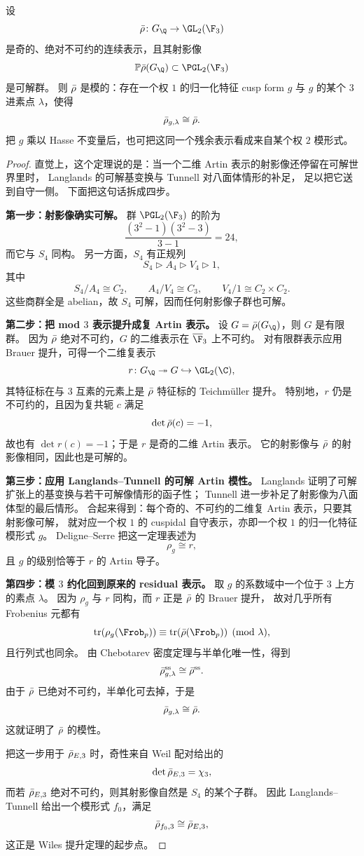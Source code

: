 \begin{lemma}
\label{lem:ch10-langlands-tunnell}
设
\[
  \rhobar\colon G_\Q\to \GL_2(\F_3)
\]
是奇的、绝对不可约的连续表示，且其射影像
\[
  \mathbb P\rhobar(G_\Q)\subset \PGL_2(\F_3)
\]
是可解群。
则 $\bar{\rho}$ 是模的：存在一个权 $1$ 的归一化特征 cusp form $g$ 与 $g$ 的某个 $3$ 进素点 $\lambda$，使得
\[
  \bar{\rho}_{g,\lambda}\cong \bar{\rho}.
\]
把 $g$ 乘以 Hasse 不变量后，也可把这同一个残余表示看成来自某个权 $2$ 模形式。
\end{lemma}

\begin{proof}
直觉上，这个定理说的是：当一个二维 Artin 表示的射影像还停留在可解世界里时，
Langlands 的可解基变换与 Tunnell 对八面体情形的补足，
足以把它送到自守一侧。
下面把这句话拆成四步。

\textbf{第一步：射影像确实可解。}
群 $\PGL_2(\F_3)$ 的阶为
\[
  \frac{(3^2-1)(3^2-3)}{3-1}=24,
\]
而它与 $S_4$ 同构。
另一方面，$S_4$ 有正规列
\[
  S_4\triangleright A_4\triangleright V_4\triangleright 1,
\]
其中
\[
  S_4/A_4\cong C_2,
  \qquad
  A_4/V_4\cong C_3,
  \qquad
  V_4/1\cong C_2\times C_2.
\]
这些商群全是 abelian，故 $S_4$ 可解，因而任何射影像子群也可解。

\textbf{第二步：把 mod $3$ 表示提升成复 Artin 表示。}
设 $G=\rhobar(G_\Q)$，则 $G$ 是有限群。
因为 $\bar{\rho}$ 绝对不可约，$G$ 的二维表示在 $\overline{\F}_3$ 上不可约。
对有限群表示应用 Brauer 提升，可得一个二维复表示
\[
  r\colon G_\Q\twoheadrightarrow G\hookrightarrow \GL_2(\C),
\]
其特征标在与 $3$ 互素的元素上是 $\bar{\rho}$ 特征标的 Teichm\"uller 提升。
特别地，$r$ 仍是不可约的，且因为复共轭 $c$ 满足
\[
  \det \bar{\rho}(c)=-1,
\]
故也有 $\det r(c)=-1$；于是 $r$ 是奇的二维 Artin 表示。
它的射影像与 $\bar{\rho}$ 的射影像相同，因此也是可解的。

\textbf{第三步：应用 Langlands--Tunnell 的可解 Artin 模性。}
Langlands 证明了可解扩张上的基变换与若干可解像情形的函子性；
Tunnell 进一步补足了射影像为八面体型的最后情形。
合起来得到：每个奇的、不可约的二维复 Artin 表示，只要其射影像可解，
就对应一个权 $1$ 的 cuspidal 自守表示，亦即一个权 $1$ 的归一化特征模形式 $g$。
Deligne--Serre 把这一定理表述为
\[
  \rho_g\cong r,
\]
且 $g$ 的级别恰等于 $r$ 的 Artin 导子。

\textbf{第四步：模 $3$ 约化回到原来的 residual 表示。}
取 $g$ 的系数域中一个位于 $3$ 上方的素点 $\lambda$。
因为 $\rho_g$ 与 $r$ 同构，而 $r$ 正是 $\bar{\rho}$ 的 Brauer 提升，
故对几乎所有 Frobenius 元都有
\[
  \operatorname{tr}(\rho_g(\Frob_p))\equiv \operatorname{tr}(\rhobar(\Frob_p))\pmod{\lambda},
\]
且行列式也同余。
由 Chebotarev 密度定理与半单化唯一性，得到
\[
  \bar{\rho}_{g,\lambda}^{\mathrm{ss}}\cong \bar{\rho}^{\mathrm{ss}}.
\]
由于 $\bar{\rho}$ 已绝对不可约，半单化可去掉，于是
\[
  \bar{\rho}_{g,\lambda}\cong \bar{\rho}.
\]
这就证明了 $\bar{\rho}$ 的模性。

把这一步用于 $\bar{\rho}_{E,3}$ 时，奇性来自 Weil 配对给出的
\[
  \det \bar{\rho}_{E,3}=\chi_3,
\]
而若 $\bar{\rho}_{E,3}$ 绝对不可约，则其射影像自然是 $S_4$ 的某个子群。
因此 Langlands--Tunnell 给出一个模形式 $f_0$，满足
\[
  \bar{\rho}_{f_0,3}\cong \bar{\rho}_{E,3},
\]
这正是 Wiles 提升定理的起步点。
\end{proof}

